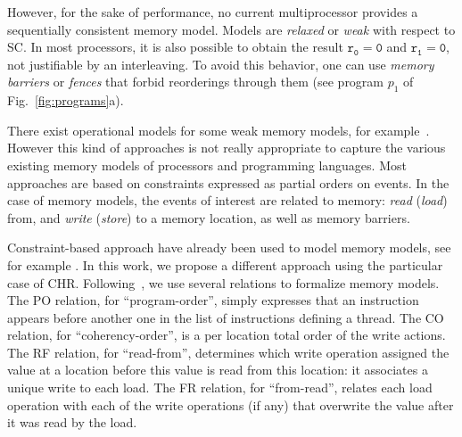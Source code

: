 However, for the sake of performance, no current multiprocessor
provides a sequentially consistent memory model. Models are \emph{relaxed} or
\emph{weak} with respect to SC. In most
processors, it is also possible  to obtain the result
$\mathtt{r_0 = 0}$ and $\mathtt{r_1 = 0}$, not justifiable by an interleaving. To avoid this behavior, 
one can use \emph{memory barriers} or {\em fences} 
that forbid reorderings through them (see
program $p_1$ of Fig.~\ref{fig:programs}a). 

There exist operational models for some weak memory models, for
example~\cite{Boudol:2009}. However this kind of approaches is not
really appropriate to capture the various existing memory models of
processors and programming languages. Most approaches are based on
constraints expressed as partial orders on events. In the case of
memory models, the events of interest are related to memory: \emph{read}
(\emph{load}) from,
and \emph{write} (\emph{store}) 
to a memory location, as well as memory barriers.

Constraint-based approach have already been used to model memory
models, see for example \cite{TVD2010:PLDI}. In this work, we propose a
different approach using the particular case of CHR.
Following~\cite{AMT2014:TPLS}, we use several relations to formalize
memory models. The PO relation, for ``program-order'', simply
expresses that an instruction appears before another one in
the list of instructions defining a thread. The CO relation, for
``coherency-order'', is a per location total order of the write
actions. The RF relation, for ``read-from'', determines which write operation 
assigned the value at a location before this value is read from this location:
it associates a unique write to  each load. The FR relation, for
``from-read'', relates each load operation
with each of the write operations (if any) 
that overwrite the value %
after it was read by the load.


